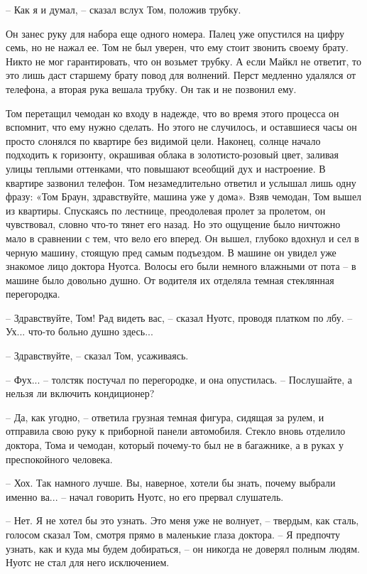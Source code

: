 – Как я и думал, – сказал вслух Том, положив трубку. 

Он занес руку для набора еще одного номера. Палец уже опустился на цифру семь, но не нажал ее. Том не был уверен, что ему стоит звонить своему брату. Никто не мог гарантировать, что он возьмет трубку. А если Майкл не ответит, то это лишь даст старшему брату повод для волнений. Перст медленно удалялся от телефона, а вторая рука вешала трубку. Он так и не позвонил ему. 

Том перетащил чемодан ко входу в надежде, что во время этого процесса он вспомнит, что ему нужно сделать. Но этого не случилось, и оставшиеся часы он просто слонялся по квартире без видимой цели. Наконец, солнце начало подходить к горизонту, окрашивая облака в золотисто-розовый цвет, заливая улицы теплыми оттенками, что повышают всеобщий дух и настроение. В квартире зазвонил телефон. Том незамедлительно ответил и услышал лишь одну фразу: «Том Браун, здравствуйте, машина уже у дома».  Взяв чемодан, Том вышел из квартиры. Спускаясь по лестнице, преодолевая пролет за пролетом, он чувствовал, словно что-то тянет его назад. Но это ощущение было ничтожно мало в сравнении с тем, что вело его вперед. Он вышел, глубоко вдохнул и сел в черную машину, стоящую пред самым подъездом. 
В машине он увидел уже знакомое лицо доктора Нуотса. Волосы его были немного влажными от пота – в машине было довольно душно. От водителя их отделяла темная стеклянная перегородка. 

– Здравствуйте, Том! Рад видеть вас, – сказал Нуотс, проводя платком по лбу. – Ух... что-то больно душно здесь...

–  Здравствуйте, – сказал Том, усаживаясь. 

– Фух... – толстяк постучал по перегородке, и она опустилась. – Послушайте, а нельзя ли включить кондиционер? 

– Да, как угодно, – ответила грузная темная фигура, сидящая за рулем, и отправила свою руку к приборной панели автомобиля. Стекло вновь отделило доктора, Тома и чемодан, который почему-то был не в багажнике, а в руках у преспокойного человека. 

– Хох. Так намного лучше. Вы, наверное, хотели бы знать, почему выбрали именно ва... – начал говорить Нуотс, но его прервал слушатель.

– Нет. Я не хотел бы это узнать. Это меня уже не волнует, – твердым, как сталь, голосом сказал Том, смотря прямо в маленькие глаза доктора. – Я предпочту узнать, как и куда мы будем добираться, – он никогда не доверял полным людям. Нуотс не стал для него исключением. 

